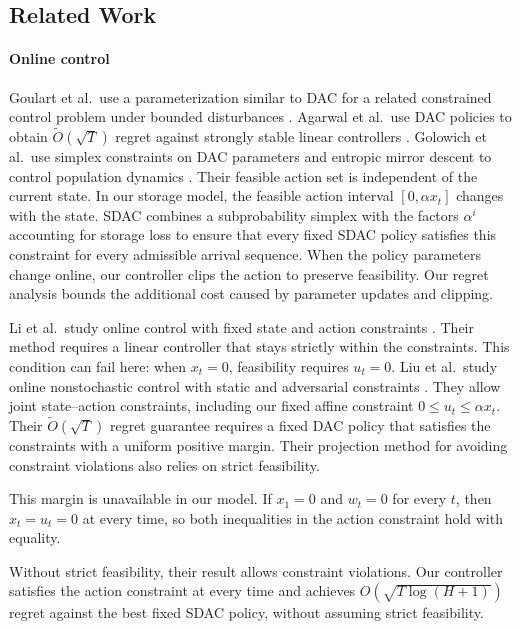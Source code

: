 \documentclass[journal]{IEEEtran}
\theoremstyle{remark}
\begin{document}
\subsection{Related Work}

\paragraph{Online control}
Goulart et al.\ use a parameterization similar to DAC for a related constrained
control problem under bounded disturbances \cite{goulart2006optimization}.
Agarwal et al.\ use DAC policies to obtain $\widetilde O(\sqrt{T})$ regret
against strongly stable linear controllers \cite{agarwal2019online}.
Golowich et al.\ use simplex constraints on DAC parameters and entropic
mirror descent to control population dynamics \cite{golowich2024population}.
Their feasible action set is independent of the current state. In our
storage model, the feasible action interval $[0,\alpha x_t]$ changes with
the state. SDAC combines a subprobability simplex with the factors
$\alpha^i$ accounting for storage loss to ensure that every fixed SDAC
policy satisfies this constraint for every admissible arrival sequence.
When the policy parameters change online, our controller clips the action
to preserve feasibility. Our regret analysis bounds the additional cost
caused by parameter updates and clipping.

Li et al.\ study online control with fixed state and action constraints
\cite{li2021onlineConstrained}. Their method requires a linear controller
that stays strictly within the constraints. This condition can fail here:
when $x_t=0$, feasibility requires $u_t=0$.
Liu et al.\ study online nonstochastic control with static and adversarial
constraints \cite{liu2023constrainedControl}. They allow joint state--action
constraints, including our fixed affine constraint $0\le u_t\le\alpha x_t$.
Their $\widetilde O(\sqrt{T})$ regret guarantee requires a fixed DAC policy
that satisfies the constraints with a uniform positive margin. Their
projection method for avoiding constraint violations also relies on strict
feasibility.

This margin is unavailable in our model. If $x_1=0$ and $w_t=0$ for every
$t$, then $x_t=u_t=0$ at every time, so both inequalities in the action
constraint hold with equality.

Without strict feasibility, their result allows constraint violations.
Our controller satisfies the action constraint at every time and achieves
$O(\sqrt{T\log(H+1)})$ regret against the best fixed SDAC policy, without
assuming strict feasibility.
\end{document}

